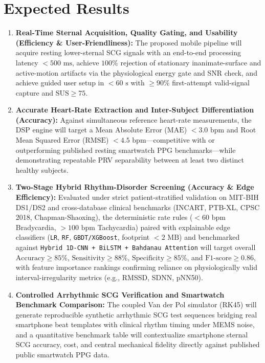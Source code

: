 \section{Expected Results}
\begin{enumerate}
	\item \textbf{Real-Time Sternal Acquisition, Quality Gating, and Usability (Efficiency \& User-Friendliness):} The proposed mobile pipeline will acquire resting lower-sternal SCG signals with an end-to-end processing latency $< 500\text{ ms}$, achieve $100\%$ rejection of stationary inanimate-surface and active-motion artifacts via the physiological energy gate and SNR check, and achieve guided user setup in $< 60\text{ s}$ with $\ge 90\%$ first-attempt valid-signal capture and $\text{SUS} \ge 75$.
	\item \textbf{Accurate Heart-Rate Extraction and Inter-Subject Differentiation (Accuracy):} Against simultaneous reference heart-rate measurements, the DSP engine will target a Mean Absolute Error ($\text{MAE}$) $< 3.0\text{ bpm}$ and Root Mean Squared Error ($\text{RMSE}$) $< 4.5\text{ bpm}$---competitive with or outperforming published resting smartwatch PPG benchmarks---while demonstrating repeatable PRV separability between at least two distinct healthy subjects.
	\item \textbf{Two-Stage Hybrid Rhythm-Disorder Screening (Accuracy \& Edge Efficiency):} Evaluated under strict patient-stratified validation on MIT-BIH DS1/DS2 \cite{goldberger2000physiobank, dechazal2004automatic} and cross-database clinical benchmarks (INCART, PTB-XL, CPSC 2018, Chapman-Shaoxing), the deterministic rate rules ($<60\text{ bpm}$ Bradycardia, $>100\text{ bpm}$ Tachycardia) paired with explainable edge classifiers (\texttt{LR}, \texttt{RF}, \texttt{GBDT/XGBoost}, footprint $< 2\text{ MB}$) and benchmarked against \texttt{Hybrid 1D-CNN + BiLSTM + Bahdanau Attention} will target overall $\text{Accuracy} \ge 85\%$, $\text{Sensitivity} \ge 88\%$, $\text{Specificity} \ge 85\%$, and $\text{F1-score} \ge 0.86$, with feature importance rankings confirming reliance on physiologically valid interval-irregularity metrics (e.g., RMSSD, SDNN, pNN50).
	\item \textbf{Controlled Arrhythmic SCG Verification and Smartwatch Benchmark Comparison:} The coupled Van der Pol simulator (RK45) will generate reproducible synthetic arrhythmic SCG test sequences bridging real smartphone beat templates with clinical rhythm timing under MEMS noise, and a quantitative benchmark table will contextualize smartphone sternal SCG accuracy, cost, and central mechanical fidelity directly against published public smartwatch PPG data.
\end{enumerate}

